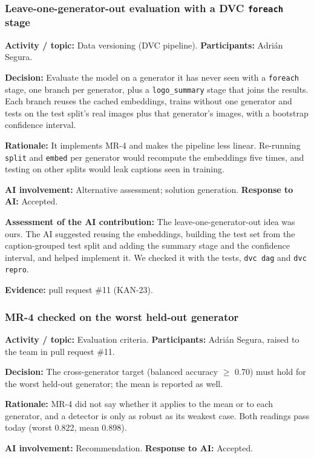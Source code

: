 \documentclass[11pt]{article}
\begin{document}
\subsubsection{Leave-one-generator-out evaluation with a DVC \texttt{foreach} stage}
\noindent\textbf{Activity / topic:} Data versioning (DVC pipeline). \textbf{Participants:} Adri\'an Segura.

\noindent\textbf{Decision:} Evaluate the model on a generator it has never seen with a \texttt{foreach} stage, one branch per generator, plus a \texttt{logo\_summary} stage that joins the results. Each branch reuses the cached embeddings, trains without one generator and tests on the test split's real images plus that generator's images, with a bootstrap confidence interval.

\noindent\textbf{Rationale:} It implements MR-4 and makes the pipeline less linear. Re-running \texttt{split} and \texttt{embed} per generator would recompute the embeddings five times, and testing on other splits would leak captions seen in training.

\noindent\textbf{AI involvement:} Alternative assessment; solution generation. \textbf{Response to AI:} Accepted.

\noindent\textbf{Assessment of the AI contribution:} The leave-one-generator-out idea was ours. The AI suggested reusing the embeddings, building the test set from the caption-grouped test split and adding the summary stage and the confidence interval, and helped implement it. We checked it with the tests, \texttt{dvc dag} and \texttt{dvc repro}.

\noindent\textbf{Evidence:} pull request \#11 (KAN-23).

\subsubsection{MR-4 checked on the worst held-out generator}
\noindent\textbf{Activity / topic:} Evaluation criteria. \textbf{Participants:} Adri\'an Segura, raised to the team in pull request \#11.

\noindent\textbf{Decision:} The cross-generator target (balanced accuracy $\geq$ 0.70) must hold for the worst held-out generator; the mean is reported as well.

\noindent\textbf{Rationale:} MR-4 did not say whether it applies to the mean or to each generator, and a detector is only as robust as its weakest case. Both readings pass today (worst 0.822, mean 0.898).

\noindent\textbf{AI involvement:} Recommendation. \textbf{Response to AI:} Accepted.
\end{document}
